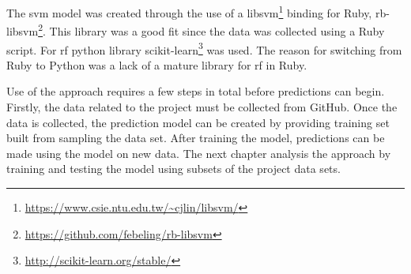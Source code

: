 
The \gls{svm} model was created through the use of a libsvm\footnote{\url{https://www.csie.ntu.edu.tw/~cjlin/libsvm/}} binding for Ruby, rb-libsvm\footnote{\url{https://github.com/febeling/rb-libsvm}}. This library was a good fit since the data was collected using a Ruby script. For \gls{rf} python library scikit-learn\footnote{\url{http://scikit-learn.org/stable/}} was used. The reason for switching from Ruby to Python was a lack of a mature library for \gls{rf} in Ruby.

Use of the approach requires a few steps in total before predictions can begin. Firstly, the data related to the project must be collected from GitHub. Once the data is collected, the prediction model can be created by providing training set built from sampling the data set. After training the model, predictions can be made using the model on new data. The next chapter analysis the approach by training and testing the model using subsets of the project data sets.